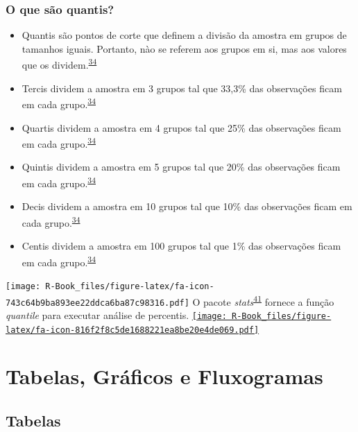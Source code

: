 \documentclass[
]{book}
\begin{document}
\hypertarget{o-que-suxe3o-quantis}{%
\subsection{O que são quantis?}\label{o-que-suxe3o-quantis}}

\begin{itemize}
\item
  Quantis são pontos de corte que definem a divisão da amostra em grupos de tamanhos iguais. Portanto, nào se referem aos grupos em si, mas aos valores que os dividem.\textsuperscript{\protect\hyperlink{ref-Altman1994}{34}}
\item
  Tercis dividem a amostra em 3 grupos tal que 33,3\% das observações ficam em cada grupo.\textsuperscript{\protect\hyperlink{ref-Altman1994}{34}}
\item
  Quartis dividem a amostra em 4 grupos tal que 25\% das observações ficam em cada grupo.\textsuperscript{\protect\hyperlink{ref-Altman1994}{34}}
\item
  Quintis dividem a amostra em 5 grupos tal que 20\% das observações ficam em cada grupo.\textsuperscript{\protect\hyperlink{ref-Altman1994}{34}}
\item
  Decis dividem a amostra em 10 grupos tal que 10\% das observações ficam em cada grupo.\textsuperscript{\protect\hyperlink{ref-Altman1994}{34}}
\item
  Centis dividem a amostra em 100 grupos tal que 1\% das observações ficam em cada grupo.\textsuperscript{\protect\hyperlink{ref-Altman1994}{34}}
\end{itemize}

\texttt{[image: R-Book\_files/figure-latex/fa-icon-743c64b9ba893ee22ddca6ba87c98316.pdf]} O pacote \emph{stats}\textsuperscript{\protect\hyperlink{ref-base}{41}} fornece a função \emph{quantile} para executar análise de percentis. \href{https://stat.ethz.ch/R-manual/R-devel/library/stats/html/quantile.html}{\texttt{[image: R-Book\_files/figure-latex/fa-icon-816f2f8c5de1688221ea8be20e4de069.pdf]}}

\hypertarget{tabelas-graficos-fluxogramas}{%
\chapter{\texorpdfstring{\textbf{Tabelas, Gráficos e Fluxogramas}}{Tabelas, Gráficos e Fluxogramas}}\label{tabelas-graficos-fluxogramas}}

\hypertarget{tabelas}{%
\section{Tabelas}\label{tabelas}}
\end{document}
